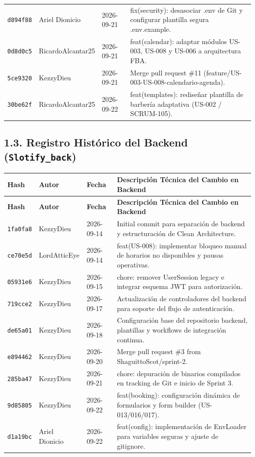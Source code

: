 \documentclass[11pt,letterpaper]{article}
\begin{document}
\begin{longtable}{L{1.5cm} L{3.2cm} C{2.1cm} L{9.0cm}}
\texttt{d894f88} & Ariel Dionicio & 2026-09-21 & fix(security): desasociar .env de Git y configurar plantilla segura .env.example. \\
\texttt{0d8d0c5} & RicardoAlcantar25 & 2026-09-21 & feat(calendar): adaptar módulos US-003, US-008 y US-006 a arquitectura FBA. \\
\texttt{5ce9320} & KezzyDieu & 2026-09-21 & Merge pull request \#11 (feature/US-003-US-008-calendario-agenda). \\
\texttt{30be62f} & RicardoAlcantar25 & 2026-09-22 & feat(templates): rediseñar plantilla de barbería adaptativa (US-002 / SCRUM-105). \\
\bottomrule
\end{longtable}

\subsection{1.3. Registro Histórico del Backend (\texttt{Slotify\_back})}
\begin{longtable}{L{1.5cm} L{3.2cm} C{2.1cm} L{9.0cm}}
\toprule
\textbf{Hash} & \textbf{Autor} & \textbf{Fecha} & \textbf{Descripción Técnica del Cambio en Backend} \\
\midrule
\endfirsthead
\toprule
\textbf{Hash} & \textbf{Autor} & \textbf{Fecha} & \textbf{Descripción Técnica del Cambio en Backend} \\
\midrule
\endhead

\texttt{1fa0fa8} & KezzyDieu & 2026-09-14 & Initial commit para separación de backend y estructuración de Clean Architecture. \\
\texttt{ce70e5d} & LordAtticEye & 2026-09-14 & feat(US-008): implementar bloqueo manual de horarios no disponibles y pausas operativas. \\
\texttt{05931e6} & KezzyDieu & 2026-09-15 & chore: remover UserSession legacy e integrar esquema JWT para autorización. \\
\texttt{719cce2} & KezzyDieu & 2026-09-17 & Actualización de controladores del backend para soporte del flujo de autenticación. \\
\texttt{de65a01} & KezzyDieu & 2026-09-18 & Configuración base del repositorio backend, plantillas y workflows de integración continua. \\
\texttt{e894462} & KezzyDieu & 2026-09-20 & Merge pull request \#3 from ShaguittoScot/sprint-2. \\
\texttt{285ba47} & KezzyDieu & 2026-09-21 & chore: depuración de binarios compilados en tracking de Git e inicio de Sprint 3. \\
\texttt{9d85805} & KezzyDieu & 2026-09-22 & feat(booking): configuración dinámica de formularios y form builder (US-013/016/017). \\
\texttt{d1a19bc} & Ariel Dionicio & 2026-09-22 & feat(config): implementación de EnvLoader para variables seguras y ajuste de gitignore. \\
\bottomrule
\end{longtable}
\end{document}
